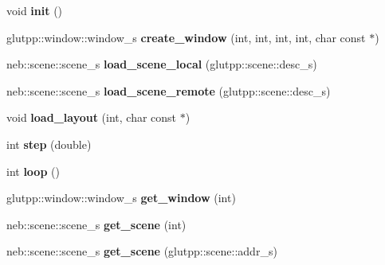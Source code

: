 \begin{DoxyCompactItemize}
\item 
\hypertarget{classneb_1_1app_a32164de189f14d814cfaca3e898b3a7f}{void {\bfseries init} ()}\label{classneb_1_1app_a32164de189f14d814cfaca3e898b3a7f}

\item 
\hypertarget{classneb_1_1app_a2e979ae56ad4a9f142816cf4df688907}{glutpp\-::window\-::window\-\_\-s {\bfseries create\-\_\-window} (int, int, int, int, char const $\ast$)}\label{classneb_1_1app_a2e979ae56ad4a9f142816cf4df688907}

\item 
\hypertarget{classneb_1_1app_abb769464af634e2ba8328437e23514f5}{neb\-::scene\-::scene\-\_\-s {\bfseries load\-\_\-scene\-\_\-local} (glutpp\-::scene\-::desc\-\_\-s)}\label{classneb_1_1app_abb769464af634e2ba8328437e23514f5}

\item 
\hypertarget{classneb_1_1app_a22d8080f269d8980d46eac3c2ce7c506}{neb\-::scene\-::scene\-\_\-s {\bfseries load\-\_\-scene\-\_\-remote} (glutpp\-::scene\-::desc\-\_\-s)}\label{classneb_1_1app_a22d8080f269d8980d46eac3c2ce7c506}

\item 
\hypertarget{classneb_1_1app_ad0e771e82f86ee786e1b342c18975fd2}{void {\bfseries load\-\_\-layout} (int, char const $\ast$)}\label{classneb_1_1app_ad0e771e82f86ee786e1b342c18975fd2}

\item 
\hypertarget{classneb_1_1app_ae364bf8705edcd0b65375d6831df326f}{int {\bfseries step} (double)}\label{classneb_1_1app_ae364bf8705edcd0b65375d6831df326f}

\item 
\hypertarget{classneb_1_1app_a3d1e3aa10f78a8e737352a90c1ff2004}{int {\bfseries loop} ()}\label{classneb_1_1app_a3d1e3aa10f78a8e737352a90c1ff2004}

\item 
\hypertarget{classneb_1_1app_a9e1237d528a0bfd338526751bff4a60d}{glutpp\-::window\-::window\-\_\-s {\bfseries get\-\_\-window} (int)}\label{classneb_1_1app_a9e1237d528a0bfd338526751bff4a60d}

\item 
\hypertarget{classneb_1_1app_a862cf4660c0ea97c1097414e2797e73f}{neb\-::scene\-::scene\-\_\-s {\bfseries get\-\_\-scene} (int)}\label{classneb_1_1app_a862cf4660c0ea97c1097414e2797e73f}

\item 
\hypertarget{classneb_1_1app_af87093d040035ac5d0d85dc5b11e0c0a}{neb\-::scene\-::scene\-\_\-s {\bfseries get\-\_\-scene} (glutpp\-::scene\-::addr\-\_\-s)}\label{classneb_1_1app_af87093d040035ac5d0d85dc5b11e0c0a}


\end{DoxyCompactItemize}
